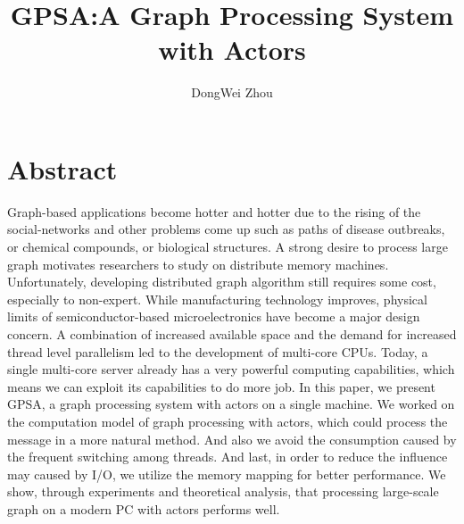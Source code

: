 \documentclass[twocolumn,a4paper,10pt]{article}
\author{DongWei Zhou}
\title{GPSA:A Graph Processing System with Actors}
\begin{document}
\maketitle
\section{Abstract}
Graph-based applications become hotter and hotter due to the rising of the social-networks and other problems come up such as paths of disease outbreaks, or chemical compounds, or biological structures. A strong desire to process large graph motivates researchers to study on distribute memory machines. Unfortunately, developing distributed graph algorithm still requires some cost, especially to non-expert. While manufacturing technology improves, physical limits of semiconductor-based microelectronics have become a major design concern. A combination of increased available space and the demand for increased thread level parallelism led to the development of multi-core CPUs. Today, a single multi-core server already has a very powerful computing capabilities, which means we can exploit its capabilities to do more job.
In this paper, we present GPSA, a graph processing system with actors on a single machine. We worked on the computation model of graph processing with actors, which could process the message in a more natural method. And also we avoid the consumption caused by the frequent switching among threads. And last, in order to reduce the influence may caused by I/O, we utilize the memory mapping for better performance. We show, through experiments and theoretical analysis, that processing large-scale graph on a modern PC with actors performs well.
\end{document}
